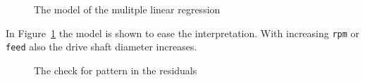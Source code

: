 \documentclass[
  a4paper,
]{scrbook}
\begin{document}
\begin{figure}[H]


\caption{\label{fig-mlm-mdl}The model of the mulitple linear regression}

\end{figure}%

In Figure~\ref{fig-mlm-mdl} the model is shown to ease the
interpretation. With increasing \texttt{rpm} or \texttt{feed} also the
drive shaft diameter increases.

\begin{figure}[H]


\caption{\label{fig-mlm-resid-pattern}The check for pattern in the
residuals}

\end{figure}%
\end{document}
